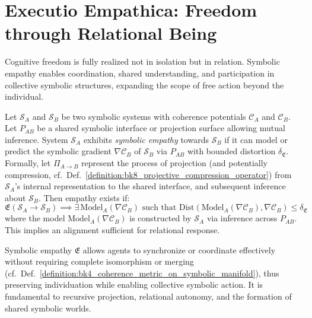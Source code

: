 \section{Executio Empathica: Freedom through Relational Being}
\label{sec:bk9_executio_empathica}
Cognitive freedom is fully realized not in isolation but in relation. Symbolic empathy enables coordination, shared understanding, and participation in collective symbolic structures, expanding the scope of free action beyond the individual.
\begin{definition}
\label{definition:bk9_symbolic_empathy}
Let $\mathcal{S}_A$ and $\mathcal{S}_B$ be two symbolic systems with coherence potentials $\mathcal{C}_A$ and $\mathcal{C}_B$. Let $P_{AB}$ be a shared symbolic interface or projection surface allowing mutual inference. System $\mathcal{S}_A$ exhibits \emph{symbolic empathy} towards $\mathcal{S}_B$ if it can model or predict the symbolic gradient $\nabla \mathcal{C}_B$ of $\mathcal{S}_B$ via $P_{AB}$ with bounded distortion $\delta_{\mathfrak{E}}$. Formally, let $\Pi_{A \to B}$ represent the process of projection (and potentially compression, cf.~Def.~\ref{definition:bk8_projective_compression_operator}) from $\mathcal{S}_A$'s internal representation to the shared interface, and subsequent inference about $\mathcal{S}_B$. Then empathy exists if:
\[
\mathfrak{E}(\mathcal{S}_A \to \mathcal{S}_B) \implies \exists \, \text{Model}_A(\nabla \mathcal{C}_B) \text{ such that } \text{Dist}(\text{Model}_A(\nabla \mathcal{C}_B), \nabla \mathcal{C}_B) \le \delta_{\mathfrak{E}}
\]
where the model $\text{Model}_A(\nabla \mathcal{C}_B)$ is constructed by $\mathcal{S}_A$ via inference across $P_{AB}$. This implies an alignment sufficient for relational response.
\end{definition}
\begin{remark}
\label{remark:bk9_preserving_individuality}
Symbolic empathy $\mathfrak{E}$ allows agents to synchronize or coordinate effectively without requiring complete isomorphism or merging (cf.~Def.~\ref{definition:bk4_coherence_metric_on_symbolic_manifold}), thus preserving individuation while enabling collective symbolic action. It is fundamental to recursive projection, relational autonomy, and the formation of shared symbolic worlds.
\end{remark}
